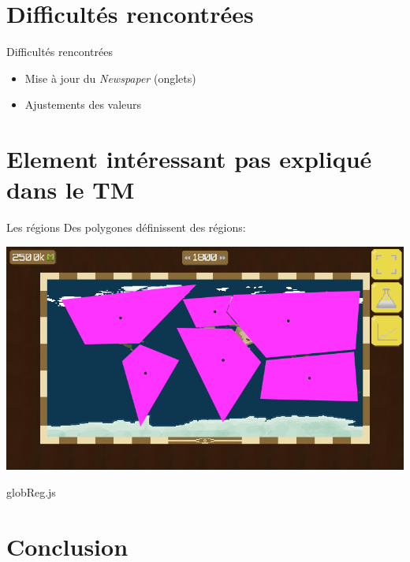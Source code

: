 \documentclass[11pt]{beamer}
\newcommand{\pauseditemize}{\pause \begin{itemize}[<+->]}
\begin{document}
\section{Difficultés rencontrées}

\begin{frame}{Difficultés rencontrées}

\pauseditemize
	\item Mise à jour du \textit{Newspaper} (onglets)
	\item Ajustements des valeurs
\end{itemize}

\end{frame}

\section{Element intéressant pas expliqué dans le TM} %

\begin{frame}{Les régions}
\pause
Des polygones définissent des régions:
\begin{center} \includegraphics[scale=.3]{../images/regionsPoly} \end{center}
\end{frame}

\begin{frame}{globReg.js}



\end{frame}

\section{Conclusion}
\end{document}
